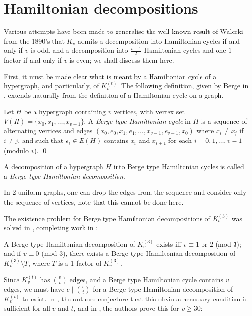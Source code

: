 \section{Hamiltonian decompositions}

Various attempts have been made to generalise the well-known result of Walecki
from the 1890's that $K_v$ admits a decomposition into Hamiltonian cycles if and only if
$v$ is odd, and a decomposition into $\frac{v-1}{2}$ Hamiltonian cycles and one $1$-factor if and
only if $v$ is even; we shall discuss them here.

First, it must be made clear what is meant by a Hamiltonian cycle of a
hypergraph, and particularly, of $K_v^{(t)}$. The following definition,
given by Berge in \cite{berge}, extends naturally from the definition of a
Hamiltonian cycle on a graph.

\begin{definition}
Let $H$ be a hypergraph containing $v$ vertices, with vertex set
$V(H) = \{x_0, x_1, \ldots, x_{v-1}\}$. A {\em Berge type Hamiltonian cycle}
in $H$ is a sequence of alternating vertices and edges $(x_0, e_0, x_1, e_1,
\ldots, x_{v-1}, e_{v-1}, x_0)$ where $x_i \neq x_j$ if $i \neq j$, and such
that $e_i \in E(H)$ contains $x_i$ and $x_{i+1}$ for each $i = 0,1,\ldots,v-1$
(modulo $v$).
\qed
\end{definition}

A decomposition of a hypergraph $H$ into Berge type Hamiltonian cycles is called
a {\em Berge type Hamiltonian decomposition}.

In 2-uniform graphs, one can drop the edges from the sequence and consider only the
sequence of vertices, note that this cannot be done here.

The existence problem for Berge type Hamiltonian decompositions of
$K_{v}^{(3)}$ was solved in \cite{verall}, completing work in \cite{bermond-al}:

\begin{theorem} \label{berge-hamilton}
A Berge type Hamiltonian decomposition of $K_v^{(3)}$ exists iff $v
\equiv 1$ or $2$ (mod $3$); and if $v \equiv 0$ (mod 3), there exists a
Berge type Hamiltonian decomposition of $K_v^{(3)} \setminus T$, where $T$ is a
1-factor of $K_{v}^{(3)}$.
\end{theorem}

Since $K_v^{(t)}$ has $v \choose t$ edges, and a Berge type Hamiltonian cycle
contains $v$ edges, we must have $v \mid {v \choose t}$ for a Berge type Hamiltonian
decomposition of $K_v^{(t)}$ to exist. In \cite{bermond}, the authors conjecture
that this obvious necessary condition is sufficient for all $v$ and $t$, and in
\cite{kuhn-osthus}, the authors prove this for $v \geq 30$:

